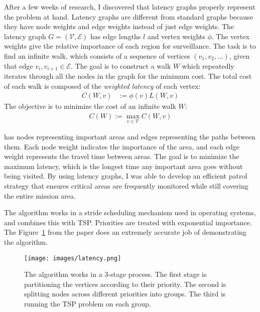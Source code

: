 \documentclass[12pt]{article}
\begin{document}
After a few weeks of research, I discovered that latency graphs properly represent the problem at hand. Latency graphs are different from standard graphs because they have node weights and edge weights instead of just edge weights. The latency graph $G = (\mathcal{V},\mathcal{E})$ has edge lengths $l$ and vertex weights $\phi$. The vertex weights give the relative importance of each region for surveillance. The task is to find an infinite walk, which consists of a sequence of vertices $(v_1,v_2,...)$, given that edge $v_i,v_{i+1} \in \mathcal{E}$. The goal is to construct a walk $W$ which repeatedly iterates through all the nodes in the graph for the minimum cost. The total cost of each walk is composed of the \textit{weighted latency} of each vertex:
\begin{align}
C(W,v) &:= \phi(v)L(W,v)
\end{align}
The objective is to minimize the cost of an infinite walk $W$:
\begin{align}
C(W) := \max_{v\in\mathcal{V}}C(W,v)
\end{align}

has nodes representing important areas and edges representing the paths between them. Each node weight indicates the importance of the area, and each edge weight represents the travel time between areas. The goal is to minimize the maximum latency, which is the longest time any important area goes without being visited. By using latency graphs, I was able to develop an efficient patrol strategy that ensures critical areas are frequently monitored while still covering the entire mission area.

The algorithm works in a stride scheduling mechanism used in operating systems, and combines this with TSP. Priorities are treated with exponential importance. The Figure~\ref{fig:latency} from the paper does an extremely accurate job of demonstrating the algorithm.
\begin{figure}[h]
    \centering
    \texttt{[image: images/latency.png]}
    \caption{The algorithm works in a 3-stage process. The first stage is partitioning the vertices according to their priority. The second is splitting nodes across different priorities into groups. The third is running the TSP problem on each group.}
    \label{fig:latency}
\end{figure}
\cite{alamdariPersistentMonitoringDiscrete2012}
\end{document}
